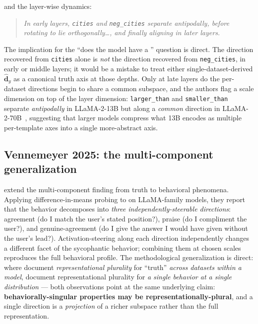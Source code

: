 \noindent and the layer-wise dynamics:

\begin{quote}
\itshape
In early layers, \texttt{cities} and \texttt{neg\_cities} separate
antipodally, before rotating to lie orthogonally\dots, and finally
aligning in later layers.~\citep[\S 4 / App.~C]{marks-tegmark-2023-truth}
\end{quote}

The implication for the ``does the model have a ''
question is direct. The  direction recovered from
\texttt{cities} alone is \emph{not} the  direction recovered from
\texttt{neg\_cities}, in early or middle layers; it would be a mistake
to treat either single-dataset-derived $\hat{\mathbf{d}}_y$ as a
canonical truth axis at those depths. Only at late layers do the
per-dataset directions begin to share a common subspace, and the
authors flag a scale dimension on top of the layer dimension:
\texttt{larger\_than} and \texttt{smaller\_than} separate
\emph{antipodally} in LLaMA-2-13B but along a \emph{common} direction
in LLaMA-2-70B~\citep[\S 4]{marks-tegmark-2023-truth}, suggesting that
larger models compress what 13B encodes as multiple per-template
axes into a single more-abstract axis.

\subsection{Vennemeyer 2025: the multi-component generalization}
\label{sec:vennemeyer-multicomponent}

\citet{vennemeyer2025-sycophancy-not-one-thing}
extend the multi-component finding from truth to behavioral
phenomena. Applying difference-in-means probing to  on
LLaMA-family models, they report that the behavior decomposes into
\emph{three independently-steerable directions}: agreement (do I
match the user's stated position?), praise (do I compliment the
user?), and genuine-agreement (do I give the answer I would have %
given without the user's lead?). Activation-steering along each
direction independently changes a different facet of the sycophantic
behavior; combining them at chosen scales reproduces the full
behavioral profile. The methodological generalization is direct:
where \citeauthor{marks-tegmark-2023-truth} document
\emph{representational plurality} for ``truth'' \emph{across datasets
within a model}, \citeauthor{vennemeyer2025-sycophancy-not-one-thing}
document representational plurality for \emph{a single behavior at a
single distribution} --- both observations point at the same
underlying claim: \textbf{behaviorally-singular properties may be
representationally-plural}, and a single direction is a
\emph{projection} of a richer subspace rather than the full
representation.

